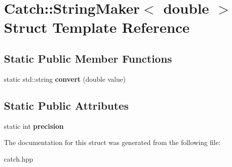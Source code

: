 \hypertarget{structCatch_1_1StringMaker_3_01double_01_4}{}\section{Catch\+:\+:String\+Maker$<$ double $>$ Struct Template Reference}
\label{structCatch_1_1StringMaker_3_01double_01_4}
\subsection*{Static Public Member Functions}
\begin{DoxyCompactItemize}
\item 
\mbox{\label{structCatch_1_1StringMaker_3_01double_01_4_acaa61529acad2462292c747d34e5f3d2}} 
static std\+::string {\bfseries convert} (double value)
\end{DoxyCompactItemize}
\subsection*{Static Public Attributes}
\begin{DoxyCompactItemize}
\item 
\mbox{\label{structCatch_1_1StringMaker_3_01double_01_4_a15fa2b093c532ece7f1d0c713ebaee67}} 
static int {\bfseries precision}
\end{DoxyCompactItemize}


The documentation for this struct was generated from the following file\+:\begin{DoxyCompactItemize}
\item 
catch.\+hpp\end{DoxyCompactItemize}
